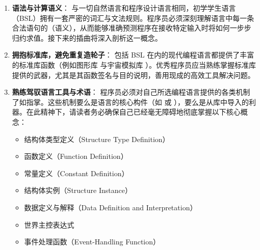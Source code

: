 \begin{notebox}[第一部分核心心得归纳]
\begin{enumerate}[label=\textbf{\arabic*.}]
  \item \textbf{语法与计算语义}：
    与一切自然语言和程序设计语言相同，初学学生语言（BSL）拥有一套严密的词汇与文法规则。程序员必须深刻理解语言中每一条合法语句的（语义），从而能够准确预测程序在接收特定输入时将如何一步步归约求值。接下来的插曲将深入剖析这一概念。

  \item \textbf{拥抱标准库，避免重复造轮子}：
    包括 BSL 在内的现代编程语言都提供了丰富的标准库函数（例如图形库  与宇宙模拟库 ）。优秀程序员应当熟练掌握标准库提供的武器，尤其是其函数签名与目的说明，善用现成的高效工具解决问题。

  \item \textbf{熟练驾驭语言工具与术语}：
    程序员必须对自己所选编程语言提供的各类机制了如指掌。这些机制要么是语言的核心构件（如  或 ），要么是从库中导入的利器。在此精神下，请读者务必确保自己已经毫无障碍地彻底掌握以下核心概念：
    \begin{itemize}
      \item 结构体类型定义（Structure Type Definition）
      \item 函数定义（Function Definition）
      \item 常量定义（Constant Definition）
      \item 结构体实例（Structure Instance）
      \item 数据定义与解释（Data Definition and Interpretation）
      \item 世界主控表达式 
      \item 事件处理函数（Event-Handling Function）
    \end{itemize}
\end{enumerate}
\end{notebox}
